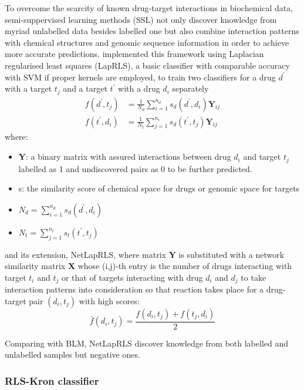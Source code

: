 \documentclass[a4paper,12pt]{report}
\begin{document}
To overcome the scarcity of known drug-target interactions in biochemical data, semi-suppervised learning methods (SSL) not only discover knowledge from myriad unlabelled data besides labelled one but also combine interaction patterns with chemical structures and genomic sequence information in order to achieve more accurate predictions. \citet{xia10} implemented this framework using Laplacian regularised least squares (LapRLS), a basic classifier with comparable accuracy with SVM if proper kernels are employed, to train two classifiers for a  drug $d^{'}$ with a target $t_j$ and a target $t^{'}$ with a drug $d_i$ separately
\begin{eqnarray}
f(d^{'}, t_j) &= \frac{1}{N_d}\sum^{n_d}_{i=1}s_d(d^{'}, d_i)\mathbf{Y}_{ij}\\
f(t^{'}, d_i) &= \frac{1}{N_t}\sum^{n_t}_{j=1}s_d(t^{'}, t_j)\mathbf{Y}_{ij}
\end{eqnarray}
where: 
\begin{itemize}
\item[]  \textbf{Y}: a binary matrix with assured interactions between drug $d_i$ and target $t_j$ labelled as 1 and undiscovered pairs as 0 to be further predicted.
\item[] s: the similarity score of chemical space for drugs or genomic space for targets
\item[] $N_d = \sum^{n_d}_{i=1}s_d(d^{'}, d_i)$
\item[] $N_t = \sum^{n_t}_{j=1}s_t(t^{'}, t_j)$
\end{itemize}
and its extension, NetLapRLS, where matrix \textbf{Y} is substituted with a network similarity matrix \textbf{X} whose (i,j)-th entry is the number of drugs interacting with target $t_i$ and $t_j$ or that of targets interacting with drug $d_i$ and $d_j$ to take interaction patterns into consideration so that reaction takes place for a drug-target pair $(d_i, t_j)$ with high scores:
\begin{equation}
\bar{f}(d_i, t_j) = \frac{f(d_i, t_j)+f(t_j, d_i)}{2}
\end{equation}

Comparing with BLM, NetLapRLS discover knowledge from both labelled and unlabelled samples but negative ones.

\subsubsection{RLS-Kron classifier}
\end{document}
